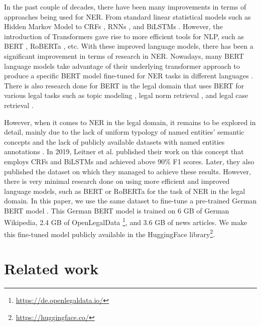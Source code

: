 \documentclass[a4paper,twoside]{article}
\begin{document}
In the past couple of decades, there have been many improvements in terms of approaches being used for NER. From standard linear statistical models such as Hidden Markov Model \cite{mayfield2003named,morwal2012named} to CRFs \cite{lafferty2001conditional,finkel2005incorporating,benikova2015c}, RNNs \cite{chowdhury2018multitask,li2020wcp}, and BiLSTMs \cite{huang2015bidirectional,lample2016neural}. However, the introduction of Transformers \cite{vaswani2017attention} gave rise to more efficient tools for NLP, such as BERT \cite{devlin2018bert}, RoBERTa \cite{liu2019roberta}, etc. With these improved language models, there has been a significant improvement in terms of research in NER. Nowadays, many BERT language models take advantage of their underlying transformer approach to produce a specific BERT model fine-tuned for NER tasks in different languages \cite{souza2019portuguese,labusch2019bert,jia2020entity,taher2020beheshti}. There is also research done for BERT in the legal domain that uses BERT for various legal tasks such as topic modeling \cite{silveira2021topic}, legal norm retrieval \cite{wehnert2021legal}, and legal case retrieval \cite{shao2020bert}.

However, when it comes to NER in the legal domain, it remains to be explored in detail, mainly due to the lack of uniform typology of named entities' semantic concepts and the lack of publicly available datasets with named entities annotations \cite{leitner2020dataset}. In 2019, Leitner et al. \cite{leitner2019fine} published their work on this concept that employs CRFs and BiLSTMs and achieved above 90\% F1 scores. Later, they also published the dataset on which they managed to achieve these results. However, there is very minimal research done on using more efficient and improved language models, such as BERT or RoBERTa for the task of NER in the legal domain. In this paper, we use the same dataset to fine-tune a pre-trained German BERT model \cite{chan2020german}. This German BERT model is trained on 6 GB of German Wikipedia, 2.4 GB of OpenLegalData \footnote{\url{https://de.openlegaldata.io/}}, and 3.6 GB of news articles. We make this fine-tuned model publicly available in the HuggingFace library\footnote{\url{https://huggingface.co/}}.

\section{Related work}
\end{document}
